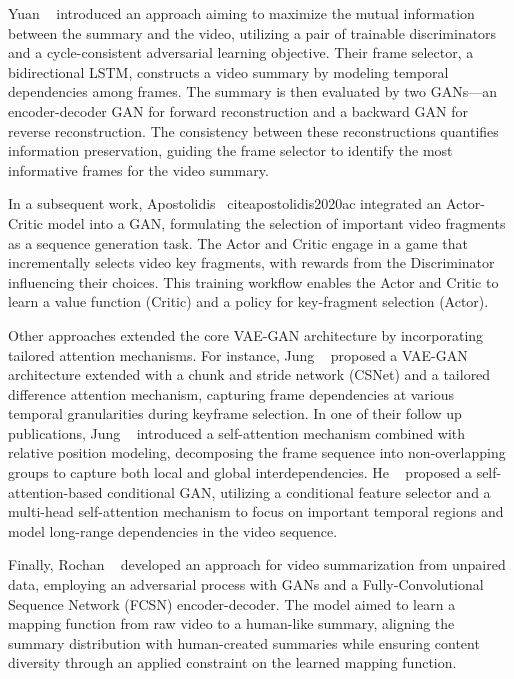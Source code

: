         Yuan \etal~\cite{yuan2019cycle} introduced an approach aiming to maximize the mutual information between the summary and the video, utilizing a pair of trainable discriminators and a cycle-consistent adversarial learning objective. Their frame selector, a bidirectional LSTM, constructs a video summary by modeling temporal dependencies among frames. The summary is then evaluated by two GANs—an encoder-decoder GAN for forward reconstruction and a backward GAN for reverse reconstruction. The consistency between these reconstructions quantifies information preservation, guiding the frame selector to identify the most informative frames for the video summary.
        
        In a subsequent work, Apostolidis \etal~cite{apostolidis2020ac} integrated an Actor-Critic model into a GAN, formulating the selection of important video fragments as a sequence generation task. The Actor and Critic engage in a game that incrementally selects video key fragments, with rewards from the Discriminator influencing their choices. This training workflow enables the Actor and Critic to learn a value function (Critic) and a policy for key-fragment selection (Actor).
        
        Other approaches extended the core VAE-GAN architecture by incorporating tailored attention mechanisms. For instance, Jung \etal~\cite{jung2019discriminative} proposed a VAE-GAN architecture extended with a chunk and stride network (CSNet) and a tailored difference attention mechanism, capturing frame dependencies at various temporal granularities during keyframe selection. In one of their follow up publications, Jung \etal~\cite{jung2020global} introduced a self-attention mechanism combined with relative position modeling, decomposing the frame sequence into non-overlapping groups to capture both local and global interdependencies. He \etal~\cite{he2019unsupervised} proposed a self-attention-based conditional GAN, utilizing a conditional feature selector and a multi-head self-attention mechanism to focus on important temporal regions and model long-range dependencies in the video sequence.
        
        Finally, Rochan \etal~\cite{rochan2019video} developed an approach for video summarization from unpaired data, employing an adversarial process with GANs and a Fully-Convolutional Sequence Network (FCSN) encoder-decoder. The model aimed to learn a mapping function from raw video to a human-like summary, aligning the summary distribution with human-created summaries while ensuring content diversity through an applied constraint on the learned mapping function.

